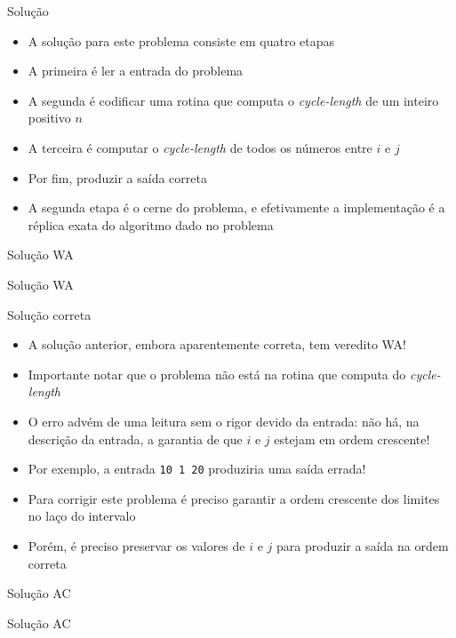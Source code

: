 \begin{frame}[fragile]{Solução}

    \begin{itemize}
        \item A solução para este problema consiste em quatro etapas

        \item A primeira é ler a entrada do problema

        \item A segunda é codificar uma rotina que computa o \textit{cycle-length} de um inteiro
            positivo $n$

        \item A terceira é computar o \textit{cycle-length} de todos os números entre $i$ e $j$

        \item Por fim, produzir a saída correta 

        \item A segunda etapa é o cerne do problema, e efetivamente a implementação é a réplica
            exata do algoritmo dado no problema
   \end{itemize}

\end{frame}

\begin{frame}[fragile]{Solução WA}
\end{frame}

\begin{frame}[fragile]{Solução WA}
\end{frame}

\begin{frame}[fragile]{Solução correta}

    \begin{itemize}
        \item A solução anterior, embora aparentemente correta, tem veredito WA!

        \item Importante notar que o problema não está na rotina que computa do
            \textit{cycle-length}

        \item O erro advém de uma leitura sem o rigor devido da entrada: não há, na descrição
            da entrada, a garantia de que $i$ e $j$ estejam em ordem crescente!

        \item Por exemplo, a entrada \texttt{10 1 20} produziria uma saída errada!

        \item Para corrigir este problema é preciso garantir a ordem crescente dos limites
            no laço do intervalo

        \item Porém, é preciso preservar os valores de $i$ e $j$ para produzir a saída na 
            ordem correta
    \end{itemize}

\end{frame}

\begin{frame}[fragile]{Solução AC}
\end{frame}

\begin{frame}[fragile]{Solução AC}
\end{frame}
